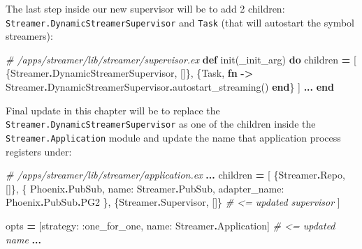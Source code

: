 \documentclass[
  oneside]{book}
\newenvironment{Shaded}{\begin{snugshade}}{\end{snugshade}}
\newcommand{\CommentTok}[1]{\textcolor[rgb]{0.56,0.35,0.01}{\textit{#1}}}
\newcommand{\ConstantTok}[1]{\textcolor[rgb]{0.00,0.00,0.00}{#1}}
\newcommand{\KeywordTok}[1]{\textcolor[rgb]{0.13,0.29,0.53}{\textbf{#1}}}
\newcommand{\NormalTok}[1]{#1}
\newcommand{\OperatorTok}[1]{\textcolor[rgb]{0.81,0.36,0.00}{\textbf{#1}}}
\newcommand{\VariableTok}[1]{\textcolor[rgb]{0.00,0.00,0.00}{#1}}
\begin{document}
The last step inside our new supervisor will be to add 2 children: \texttt{Streamer.DynamicStreamerSupervisor} and \texttt{Task} (that will autostart the symbol streamers):

\begin{Shaded}
\begin{Highlighting}[]
\CommentTok{\# /apps/streamer/lib/streamer/supervisor.ex}
  \KeywordTok{def}\NormalTok{ init(\_init\_arg) }\KeywordTok{do}
\NormalTok{    children }\OperatorTok{=}\NormalTok{ [}
\NormalTok{      \{}\ConstantTok{Streamer}\OperatorTok{.}\ConstantTok{DynamicStreamerSupervisor}\NormalTok{, []\},}
\NormalTok{      \{}\ConstantTok{Task}\NormalTok{,}
       \KeywordTok{fn} \OperatorTok{{-}\textgreater{}}
         \ConstantTok{Streamer}\OperatorTok{.}\ConstantTok{DynamicStreamerSupervisor}\OperatorTok{.}\NormalTok{autostart\_streaming()}
       \KeywordTok{end}\NormalTok{\}}
\NormalTok{    ]}
    \OperatorTok{...}
  \KeywordTok{end}
\end{Highlighting}
\end{Shaded}

Final update in this chapter will be to replace the \texttt{Streamer.DynamicStreamerSupervisor} as one of the children inside the \texttt{Streamer.Application} module and update the name that application process registers under:

\begin{Shaded}
\begin{Highlighting}[]
\CommentTok{\# /apps/streamer/lib/streamer/application.ex}
    \OperatorTok{...}
\NormalTok{    children }\OperatorTok{=}\NormalTok{ [}
\NormalTok{      \{}\ConstantTok{Streamer}\OperatorTok{.}\ConstantTok{Repo}\NormalTok{, []\},}
\NormalTok{      \{}
        \ConstantTok{Phoenix}\OperatorTok{.}\ConstantTok{PubSub}\NormalTok{,}
        \VariableTok{name:} \ConstantTok{Streamer}\OperatorTok{.}\ConstantTok{PubSub}\NormalTok{, }\VariableTok{adapter\_name:} \ConstantTok{Phoenix}\OperatorTok{.}\ConstantTok{PubSub}\OperatorTok{.}\ConstantTok{PG2}
\NormalTok{      \},}
\NormalTok{      \{}\ConstantTok{Streamer}\OperatorTok{.}\ConstantTok{Supervisor}\NormalTok{, []\} }\CommentTok{\# \textless{}= updated supervisor}
\NormalTok{    ]}

\NormalTok{    opts }\OperatorTok{=}\NormalTok{ [}\VariableTok{strategy:} \VariableTok{:one\_for\_one}\NormalTok{, }\VariableTok{name:} \ConstantTok{Streamer}\OperatorTok{.}\ConstantTok{Application}\NormalTok{] }\CommentTok{\# \textless{}= updated name}
    \OperatorTok{...}
\end{Highlighting}
\end{Shaded}
\end{document}
